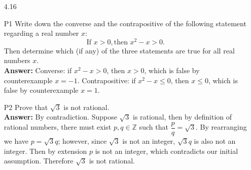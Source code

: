 \documentclass{article}
\begin{document}
\begin{itemize}
    \item [4.16]
    \item [P1] Write down the converse and the contrapositive of the following statement regarding a real number $x$: \[\text{If } x>0, \text{then } x^2-x>0.\] Then determine which (if any) of the three statements are true for all real numbers $x$.\\
          \textbf{Answer: } Converse: if $x^2-x>0$, then $x>0$, which is false by counterexample $x=-1$. Contrapositive: if $x^2-x\leq0$, then $x\leq0$, which is false by counterexample $x=1$.
    \item [P2] Prove that $\sqrt{3}$ is not rational.\\
          \textbf{Answer: } By contradiction. Suppose $\sqrt{3}$ is rational, then by definition of rational numbers, there must exist $p,q\in\mathbb{Z}$ such that $\dfrac{p}{q}=\sqrt{3}$. By rearranging we have $p=\sqrt{3}q$; however, since $\sqrt{3}$ is not an integer, $\sqrt{3}q$ is also not an integer. Then by extension $p$ is not an integer, which contradicts our initial assumption. Therefore $\sqrt{3}$ is not rational.
\end{itemize}
\end{document}

